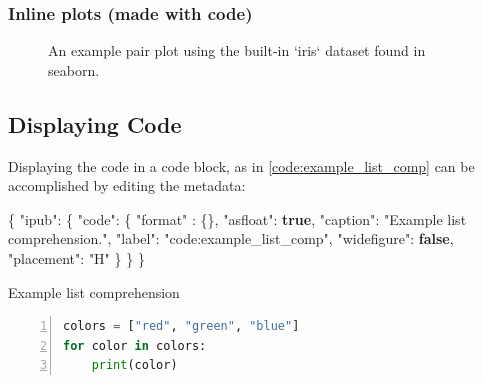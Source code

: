 \documentclass[10pt,parskip=half,
	toc=sectionentrywithdots,
	bibliography=totocnumbered,
	captions=tableheading,
    numbers=noendperiod,
    headings=standardclasses]{scrartcl}
\newenvironment{Shaded}{}{}
\newcommand{\KeywordTok}[1]{\textcolor[rgb]{0.00,0.44,0.13}{\textbf{{#1}}}}
\newcommand{\DataTypeTok}[1]{\textcolor[rgb]{0.56,0.13,0.00}{{#1}}}
\newcommand{\StringTok}[1]{\textcolor[rgb]{0.25,0.44,0.63}{{#1}}}
\newcommand{\FunctionTok}[1]{\textcolor[rgb]{0.02,0.16,0.49}{{#1}}}
\begin{document}
\subsubsection{Inline plots (made with
code)}\label{inline-plots-made-with-code}

\begin{figure}[H]\begin{center}\end{center}\caption{An example pair plot using the built-in `iris` dataset found in seaborn.}\label{fig:pairplot}
    \end{figure}

\subsection{Displaying Code}\label{displaying-code}

Displaying the code in a code block, as in \cref{code:example_list_comp}
can be accomplished by editing the metadata:

\begin{Shaded}
\begin{Highlighting}[]
\FunctionTok{\{}
\DataTypeTok{"ipub"}\FunctionTok{:} \FunctionTok{\{}
  \DataTypeTok{"code"}\FunctionTok{:} \FunctionTok{\{}
  \DataTypeTok{"format"} \FunctionTok{:} \FunctionTok{\{\},}
    \DataTypeTok{"asfloat"}\FunctionTok{:} \KeywordTok{true}\FunctionTok{,}
    \DataTypeTok{"caption"}\FunctionTok{:} \StringTok{"Example list comprehension."}\FunctionTok{,}
    \DataTypeTok{"label"}\FunctionTok{:} \StringTok{"code:example_list_comp"}\FunctionTok{,}
    \DataTypeTok{"widefigure"}\FunctionTok{:} \KeywordTok{false}\FunctionTok{,}
    \DataTypeTok{"placement"}\FunctionTok{:} \StringTok{"H"}
    \FunctionTok{\}}
  \FunctionTok{\}}
\FunctionTok{\}}
\end{Highlighting}
\end{Shaded}

\begin{codecell}[H]

    \caption{Example list comprehension}\label{code:example_list_comp}\begin{lstlisting}[language=Python,numbers=left,xleftmargin=20pt,xrightmargin=5pt,belowskip=5pt,aboveskip=5pt]
colors = ["red", "green", "blue"]
for color in colors:
    print(color)
\end{lstlisting}\end{codecell}
\end{document}
